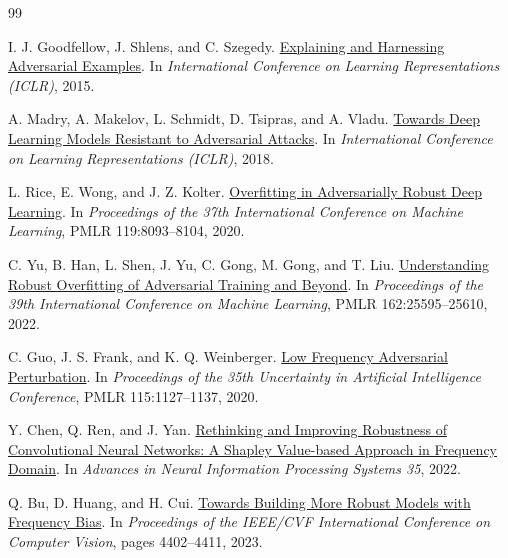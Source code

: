 \documentclass{article}
\begin{document}
\FloatBarrier
\begin{thebibliography}{99}

I. J. Goodfellow, J. Shlens, and C. Szegedy.
\newblock \href{https://arxiv.org/abs/1412.6572}{Explaining and Harnessing Adversarial Examples}.
\newblock In \emph{International Conference on Learning Representations
(ICLR)}, 2015.

A. Madry, A. Makelov, L. Schmidt, D. Tsipras, and A. Vladu.
\newblock \href{https://arxiv.org/abs/1706.06083}{Towards Deep Learning Models Resistant to Adversarial Attacks}.
\newblock In \emph{International Conference on Learning Representations
(ICLR)}, 2018.

L. Rice, E. Wong, and J. Z. Kolter.
\newblock \href{https://proceedings.mlr.press/v119/rice20a.html}{Overfitting in Adversarially Robust Deep Learning}.
\newblock In \emph{Proceedings of the 37th International Conference on Machine
Learning}, PMLR 119:8093--8104, 2020.

C. Yu, B. Han, L. Shen, J. Yu, C. Gong, M. Gong, and T. Liu.
\newblock \href{https://proceedings.mlr.press/v162/yu22b.html}{Understanding Robust Overfitting of Adversarial Training and Beyond}.
\newblock In \emph{Proceedings of the 39th International Conference on Machine
Learning}, PMLR 162:25595--25610, 2022.

C. Guo, J. S. Frank, and K. Q. Weinberger.
\newblock \href{https://proceedings.mlr.press/v115/guo20a.html}{Low Frequency Adversarial Perturbation}.
\newblock In \emph{Proceedings of the 35th Uncertainty in Artificial
Intelligence Conference}, PMLR 115:1127--1137, 2020.

Y. Chen, Q. Ren, and J. Yan.
\newblock \href{https://proceedings.neurips.cc/paper_files/paper/2022/hash/022abe84083d235f7572ca5cba24c51c-Abstract-Conference.html}{Rethinking and Improving Robustness of Convolutional Neural Networks:
A Shapley Value-based Approach in Frequency Domain}.
\newblock In \emph{Advances in Neural Information Processing Systems 35}, 2022.

Q. Bu, D. Huang, and H. Cui.
\newblock \href{https://openaccess.thecvf.com/content/ICCV2023/html/Bu_Towards_Building_More_Robust_Models_with_Frequency_Bias_ICCV_2023_paper.html}{Towards Building More Robust Models with Frequency Bias}.
\newblock In \emph{Proceedings of the IEEE/CVF International Conference on
Computer Vision}, pages 4402--4411, 2023.


\end{thebibliography}
\end{document}
